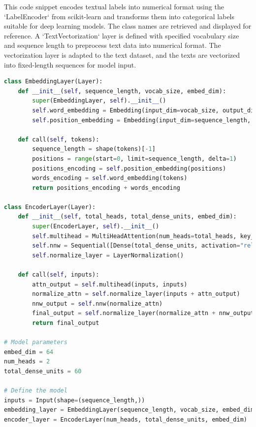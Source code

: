 This code snippet encodes textual labels into numerical format using the `LabelEncoder` from scikit-learn and transforms them into categorical labels suitable for deep learning models. The class names are retrieved and displayed for reference. A `TextVectorization` layer is defined with specified vocabulary size and sequence length to preprocess text data into numerical format. The vectorization layer is adapted to the text dataset, and the texts are vectorized into fixed-length sequences for model input.

\begin{tcolorbox}[colback=gray!5!white, colframe=gray!80!black, boxrule=0.5pt, title=Define Transformer Model]
    \begin{lstlisting}[language=Python]
class EmbeddingLayer(Layer):
    def __init__(self, sequence_length, vocab_size, embed_dim):
        super(EmbeddingLayer, self).__init__()
        self.word_embedding = Embedding(input_dim=vocab_size, output_dim=embed_dim)
        self.position_embedding = Embedding(input_dim=sequence_length, output_dim=embed_dim)

    def call(self, tokens):
        sequence_length = shape(tokens)[-1]
        positions = range(start=0, limit=sequence_length, delta=1)
        positions_encoding = self.position_embedding(positions)
        words_encoding = self.word_embedding(tokens)
        return positions_encoding + words_encoding

class EncoderLayer(Layer):
    def __init__(self, total_heads, total_dense_units, embed_dim):
        super(EncoderLayer, self).__init__()
        self.multihead = MultiHeadAttention(num_heads=total_heads, key_dim=embed_dim)
        self.nnw = Sequential([Dense(total_dense_units, activation="relu"), Dense(embed_dim)])
        self.normalize_layer = LayerNormalization()

    def call(self, inputs):
        attn_output = self.multihead(inputs, inputs)
        normalize_attn = self.normalize_layer(inputs + attn_output)
        nnw_output = self.nnw(normalize_attn)
        final_output = self.normalize_layer(normalize_attn + nnw_output)
        return final_output

# Model parameters
embed_dim = 64
num_heads = 2
total_dense_units = 60

# Define the model
inputs = Input(shape=(sequence_length,))
embedding_layer = EmbeddingLayer(sequence_length, vocab_size, embed_dim)
encoder_layer = EncoderLayer(num_heads, total_dense_units, embed_dim)
\end{lstlisting}
\end{tcolorbox}
